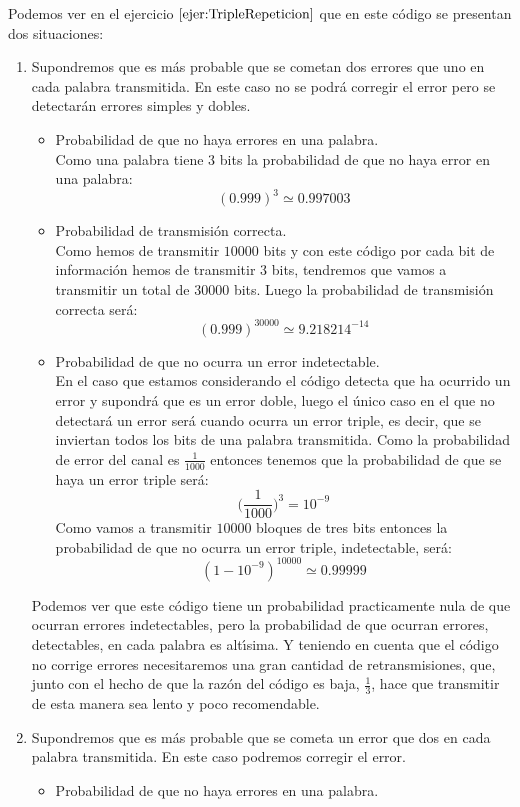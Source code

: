 Podemos ver en el ejercicio $\ref{ejer:TripleRepeticion}$ que en este c\'odigo
se presentan dos situaciones:
\begin{enumerate}
\item Supondremos que es m\'as probable que se cometan dos errores que uno
en cada palabra transmitida. En este caso no se podr\'a corregir el error pero
se detectar\'an errores simples y dobles.
\begin{itemize}
\item Probabilidad de que no haya errores en una palabra.\\

Como una palabra tiene $3$ bits la probabilidad de que no haya error en una
palabra:
$$(0.999)^3\simeq 0.997003$$
\item Probabilidad de transmisi\'on correcta.\\

Como hemos de transmitir $10000$ bits y con este c\'odigo por cada bit de
informaci\'on hemos de transmitir $3$ bits, tendremos que vamos a transmitir un
total de $30000$ bits. Luego la probabilidad de transmisi\'on correcta ser\'a:
$$(0.999)^{30000}\simeq 9.218214^{-14}$$
\item Probabilidad de que no ocurra un error indetectable.\\

En el caso que estamos considerando el c\'odigo detecta que ha ocurrido un error
y supondr\'a que es un error doble, luego el \'unico caso en el que no
detectar\'a un error ser\'a cuando ocurra un error triple, es decir, que se
inviertan todos los bits de una palabra transmitida. Como la probabilidad de
error del canal es $\frac{1}{1000}$ entonces tenemos que la probabilidad de
que se haya un error triple ser\'a:
$$\Big(\frac{1}{1000}\Big)^3= 10^{-9}$$
Como vamos a transmitir $10000$ bloques de tres bits entonces la probabilidad
de que no ocurra un error triple, indetectable, ser\'a:
$$(1-10^{-9})^{10000}\simeq 0.99999$$
\end{itemize}
%
\newpage
%
Podemos ver que este c\'odigo tiene un probabilidad practicamente nula de que
ocurran errores indetectables, pero la probabilidad de que ocurran errores, 
detectables, en cada palabra es alt\'{\i}sima. Y teniendo en cuenta que el
c\'odigo no corrige errores necesitaremos una gran cantidad de retransmisiones,
que, junto con el hecho de que la raz\'on del c\'odigo es baja, $\frac{1}{3}$,
hace que transmitir de esta manera sea lento y poco recomendable.
%
%
\item Supondremos que es m\'as probable que se cometa un error que dos en 
cada palabra transmitida. En este caso podremos corregir el error.\\
\begin{itemize}
\item Probabilidad de que no haya errores en una palabra.\\


\end{itemize}
\end{enumerate}
